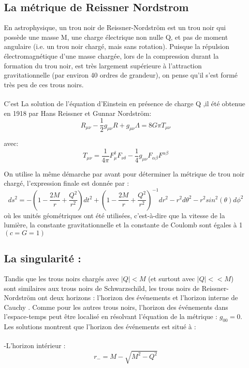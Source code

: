 \subsection{La métrique de Reissner Nordstrom}
En astrophysique, un trou noir de Reissner-Nordström est un trou noir qui possède une masse M, une charge électrique non nulle Q, et pas de moment angulaire (i.e. un trou noir chargé, mais sans rotation). Puisque la répulsion électromagnétique d'une masse chargée, lors de la compression durant la formation du trou noir, est très largement supérieure à l'attraction gravitationnelle (par environ 40 ordres de grandeur), on pense qu'il s'est formé très peu de ces trous noirs.\\
\\
C'est La solution de l'équation d'Einstein en présence de charge Q \cite{7},il été obtenue en 1918 par Hans Reissner et Gunnar Nordström:\\
\begin{equation}
R_{\mu\nu}-\dfrac{1}{2}g_{\mu\nu}R+g_{\mu\nu}\Lambda=8G\pi T_{\mu\nu}
\end{equation}

avec:
\begin{equation}
T_{\mu\nu}=\dfrac{1}{4\pi}F_{\mu}^{\delta}F_{\nu\delta}-\dfrac{1}{4}g_{\mu\nu}F_{\alpha\beta}F^{\alpha\beta}
\end{equation}

On utilise la même démarche par avant pour déterminer la métrique de trou noir chargé,
l’expression finale est donnée par :
\begin{equation}
ds^{2}=-(1-\dfrac{2M}{r}+\dfrac{Q^{2}}{r^{2}})dt^{2}+(1-\dfrac{2M}{r}+\dfrac{Q^{2}}{r^{2}})^{-1}dr^{2}-r^{2}d\theta^{2}-r^{2}sin^{2}(\theta)d\phi^{2}
\end{equation}
où les unités géométriques ont été utilisées, c'est-à-dire que la vitesse de la lumière, la constante gravitationnelle et la constante de Coulomb sont égales à 1 $(c=G=1)$ 
\subsection*{La singularité :}
Tandis que les trous noirs chargés avec $|Q|<M$ (et surtout avec  $|Q|<< M$) sont similaires aux trous noirs de Schwarzschild, les trous noirs de Reissner-Nordström ont deux horizons : l'horizon des événements et l'horizon interne de Cauchy . Comme pour les autres trous noirs, l'horizon des événements dans l'espace-temps peut être localisé en résolvant l'équation de la métrique : $ g_{00}=0$. Les solutions montrent que l'horizon des événements est situé à :\\
\\
-L’horizon intérieur :
\begin{equation}
r_{-} = M -\sqrt{M^{2}-Q^{2}}
\end{equation}

